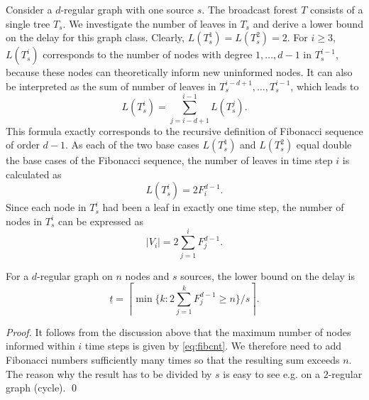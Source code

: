 Consider a $d$-regular graph with one source $s$.
The broadcast forest $T$ consists of a single tree $T_s$.
We investigate the number of leaves in $T_s$ and derive a lower bound on the delay for this graph class.
Clearly, $L(T^1_s)=L(T^2_s)=2$.
For $i\geq 3$, $L(T^i_s)$ corresponds to the number of nodes with degree $1,\dots,d-1$ in $T^{i-1}_s$, because these nodes can theoretically inform new uninformed nodes.
It can also be interpreted as the sum of number of leaves in $T^{i-d+1}_s,\dots,T^{i-1}_s$, which leads to %
\begin{equation*}
\label{eq:leafrec}
L(T^i_s)=\sum\limits_{j=i-d+1}^{i-1} L(T^j_s).
\end{equation*}  
This formula exactly corresponds to the recursive definition of Fibonacci sequence of order $d-1$.
As each of the two base cases $L(T^1_s)$ and $L(T^2_s)$ equal double the base cases of the Fibonacci sequence, the number of leaves in time step $i$ is calculated as
\begin{equation*}
\label{eq:fibleaf}
L(T^i_s)=2 F^{d-1}_i.
\end{equation*}  
Since each node in $T^i_s$ had been a leaf in exactly one time step, the number of nodes in $T^i_s$ can be expressed as 
\begin{equation}
\label{eq:fibcnt}
|V_i|=2\sum\limits_{j=1}^i F^{d-1}_j.
\end{equation}

\begin{proposition}
For a $d$-regular graph on $n$ nodes and $s$ sources, the lower bound on the delay is 
\begin{equation*}
\label{lem:lbreg1}
\underline{t}=\left\lceil\min\{k:2\sum\limits_{j=1}^k F^{d-1}_j\geq n\}/s\right\rceil.
\end{equation*}
\end{proposition}
\begin{proof}
It follows from the discussion above that the maximum number of nodes informed within $i$ time steps is given by \eqref{eq:fibcnt}.
We therefore need to add Fibonacci numbers sufficiently many times so that the resulting sum exceeds $n$.
The reason why the result has to be divided by $s$ is easy to see e.g. on a $2$-regular graph (cycle).
 \qed
\end{proof}

